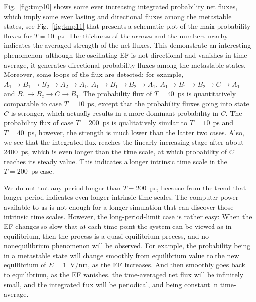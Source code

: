 \documentclass[a4paper,preprint,unsortedaddress,onecolumn]{revtex4-1}
\begin{document}
Fig.~\ref{fig:tmp10} shows some ever increasing
integrated probability net fluxes, which imply some ever lasting and directional
fluxes among the metastable states, see
Fig.~\ref{fig:tmp11} that presents a schematic plot of the main probability
fluxes for $T=10$~ps.
The thickness of the arrows and the numbers nearby indicates
the averaged strength of the net fluxes.
This demonstrate an interesting phenomenon: although
the oscillating EF is not directional and vanishes in time-average,
it generates directional probability fluxes among the metastable states.
Moreover, some loops of the flux are detected: for example, $A_1 \rightarrow B_1
\rightarrow B_2 \rightarrow A_2 \rightarrow A_1$, $A_1 \rightarrow B_1
\rightarrow B_2 \rightarrow A_1$,  $A_1 \rightarrow B_1
\rightarrow B_2 \rightarrow C \rightarrow A_1$ and $B_1
\rightarrow B_2 \rightarrow C \rightarrow B_1$.
The probability flux of $T=40$~ps is quantitatively
comparable to case $T=10$~ps, except that the probability fluxes
going into state $C$ is stronger, which actually results in
a more dominant probability in $C$.
The probability flux of case $T=200$~ps is qualitatively
similar to $T=10$~ps and $T=40$~ps, however,
the strength is much lower than the latter two cases.
Also, we see that the integrated flux reaches the linearly increasing
stage after about 2400~ps, which is even longer than the time scale,
at which probability of $C$ reaches its steady value. This indicates
a longer intrinsic time scale in the $T=200$~ps case.

We do not test any period longer than $T=200$~ps, because
from the trend that longer period indicates even longer intrinsic time scales.
The computer power available to us is not enough for a longer
simulation that can discover those intrinsic time scales.
However, the long-period-limit case is rather easy: When
the EF changes so slow that at each time point the system
can be viewed as in equilibrium, then the process is a quasi-equilibrium
process, and no nonequilibrium phenomenon will be observed. For example,
the probability being in a  metastable state will change
smoothly from equilibrium value to the new equilibrium of $E=1$~V/nm, as
the EF increases.
And then smoothly goes back to equilibrium, as the EF vanishes.
the time-averaged net flux will be infinitely small,
and the integrated flux will be periodical, and being constant in time-average.


\end{document}
